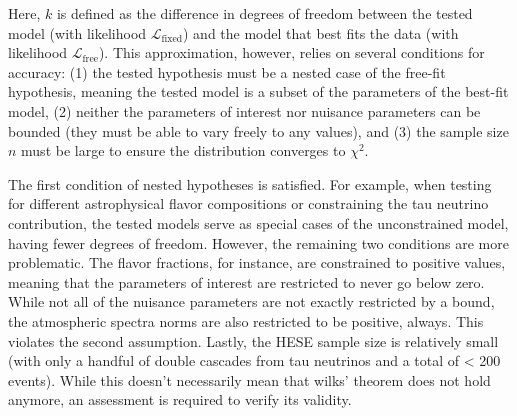 Here, \(k\) is defined as the difference in degrees of freedom between the tested model (with likelihood \(\mathcal{L}_{\text{fixed}}\)) and the model that best fits the data (with likelihood \(\mathcal{L}_{\text{free}}\)). This approximation, however, relies on several conditions for accuracy: (1) the tested hypothesis must be a nested case of the free-fit hypothesis, meaning the tested model is a subset of the parameters of the best-fit model, (2) neither the parameters of interest nor nuisance parameters can be bounded (they must be able to vary freely to any values), and (3) the sample size \(n\) must be large to ensure the distribution converges to \(\chi^2\).

The first condition of nested hypotheses is satisfied. For example, when testing for different astrophysical flavor compositions or constraining the tau neutrino contribution, the tested models serve as special cases of the unconstrained model, having fewer degrees of freedom. However, the remaining two conditions are more problematic. The flavor fractions, for instance, are constrained to positive values, meaning that the parameters of interest are restricted to never go below zero. While not all of the nuisance parameters are not exactly restricted by a bound, the atmospheric spectra norms are also restricted to be positive, always. This violates the second assumption. Lastly, the HESE sample size is relatively small (with only a handful of double cascades from tau neutrinos and a total of < 200 events). While this doesn't necessarily mean that wilks' theorem does not hold anymore, an assessment is required to verify its validity.


